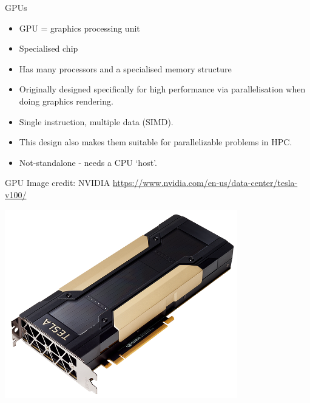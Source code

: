 \documentclass[usenames,dvipsnames]{beamer}
\begin{document}
\begin{frame}{GPUs}
  \begin{block}{}
    \begin{itemize}
      \item{GPU  = graphics processing unit}
      \item{Specialised chip}
      \item{Has many processors and a specialised memory structure}
      \item{Originally designed specifically for high performance via parallelisation when doing graphics rendering.}
      \item{Single instruction, multiple data (SIMD).}
      \item{This design also makes them suitable for parallelizable problems in HPC.}
      \item{Not-standalone - needs a CPU `host'.}
    \end{itemize}
  \end{block}
\end{frame}

\begin{frame}{GPU \tiny{Image credit: NVIDIA \url{https://www.nvidia.com/en-us/data-center/tesla-v100/}}}
  \begin{block}{}
    \begin{center}
      \includegraphics[scale=0.83]{V100_photo.png}
    \end{center}
  \end{block}
\end{frame}
\end{document}
